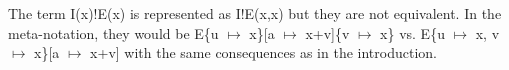 \documentclass[a4paper]{article}
\newcommand{\tla}[1]{#1}
\begin{document}
\begin{parcolumns}{2}
\end{parcolumns}

The term \tla{I(x)!E(x)} is represented as \tla{I!E(x,x)} but they are
 not equivalent. In the meta-notation, they would be
 E\{u $\mapsto$ x\}[a $\mapsto$ x+v]\{v $\mapsto$ x\} vs. E\{u $\mapsto$ x,
 v $\mapsto$ x\}[a $\mapsto$ x+v] with the same consequences as in the
 introduction.
\end{document}
